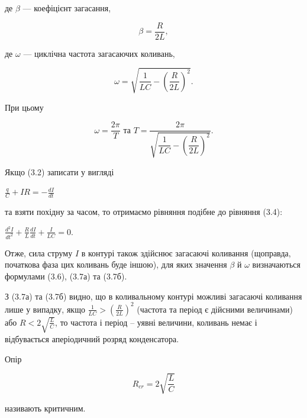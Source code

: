 \documentclass[12pt,a4paper]{article}
\begin{document}
    де $\beta$ --- коефіцієнт загасання,

    \begin{equation}
        \beta = \frac{R}{2L},
        \tag{3.6}
    \end{equation}

    де $\omega$ --- циклічна частота загасаючих коливань,

    \begin{equation}
        \omega = \sqrt{\frac{1}{LC} - \left( \frac{R}{2L}\right)^2}.
        \tag{3.7а}
    \end{equation}

    При цьому

    \begin{equation}
        \omega = \frac{2\pi}{T} \text{  та  } T = \frac{2\pi}{\sqrt{\dfrac{1}{LC} - \left( \dfrac{R}{2L}\right)^2}}.
        \tag{3.7б}
    \end{equation}

    Якщо (3.2) записати у вигляді

    \begin{center}
        $\displaystyle \frac{q}{C} + IR = -\frac{dI}{dt}$
    \end{center}

    та взяти похідну за часом, то отримаємо рівняння подібне до рівняння (3.4):

    \begin{center}
        $\displaystyle \frac{d^2I}{dt^2} + \frac{R}{L} \frac{dI}{dt} + \frac{I}{LC} = 0$.
    \end{center}

    Отже, сила струму $I$ в контурі також здійснює загасаючі коливання (щоправда, початкова фаза цих коливань буде іншою),
    для яких значення $\beta$ й $\omega$ визначаються формулами (3.6), (3.7а) та (3.7б).

    З (3.7а) та (3.7б) видно, що в коливальному контурі можливі загасаючі коливання лише у випадку,
    якщо $\displaystyle \frac{1}{LC} > \left( \frac{R}{2L}\right)^2$ (частота та період є дійсними величинами)
    або $\displaystyle R < 2\sqrt{\frac{L}{C}}$, то частота і період – уявні величини, коливань немає і відбувається
    аперіодичний розряд конденсатора.

    Опір

    \begin{equation}
        R_{cr} = 2\sqrt{\frac{L}{C}}
        \tag{3.8}
    \end{equation}

    називають критичним.
\end{document}
